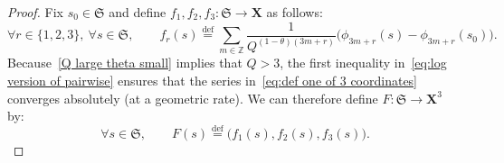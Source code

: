 \documentclass[11pt,reqno]{amsart}
\newcommand{\Z}{\mathbb{Z}}
\newcommand{\eqdef}{\stackrel{\mathrm{def}}{=}}
\newcommand{\X}{\mathbf X}
\newcommand{\1}{\mathbf{1}}
\newcommand{\fS}{\mathfrak{S}}
\begin{document}
\begin{proof} Fix $s_0\in \fS$ and define $f_1,f_2,f_3:\fS\to \X$ as follows: 
\begin{equation}\label{eq:def one of 3 coordinates}
\forall r\in \{1,2,3\},\ \forall s\in \fS,\qquad f_r(s)\eqdef \sum_{m\in \Z} \frac{1}{Q^{(1-\theta)(3m+r)}}\big(\phi_{3m+r}(s)-\phi_{3m+r}(s_0)\big).
\end{equation}
Because~\eqref{Q large theta small} implies that $Q> 3$, the first inequality in~\eqref{eq:log version of pairwise} ensures that the  series  in~\eqref{eq:def one of 3 coordinates} converges absolutely   (at a geometric rate). We can therefore define $F:\fS\to \X^3$ by:
\begin{equation}\label{eq:defF}
\forall s\in \fS,\qquad F(s)\eqdef \big(f_1(s),f_2(s),f_3(s)\big).
\end{equation}




\end{proof}
\end{document}
